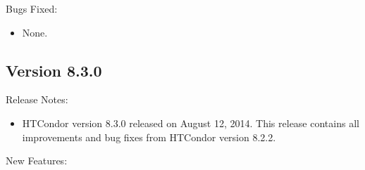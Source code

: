 \noindent Bugs Fixed:

\begin{itemize}

\item None.

\end{itemize}

\subsection*{\label{sec:New-8-3-0}Version 8.3.0}

\noindent Release Notes:

\begin{itemize}

\item HTCondor version 8.3.0 released on August 12, 2014.
This release contains all improvements and bug fixes from 
HTCondor version 8.2.2.

\end{itemize}


\noindent New Features:

